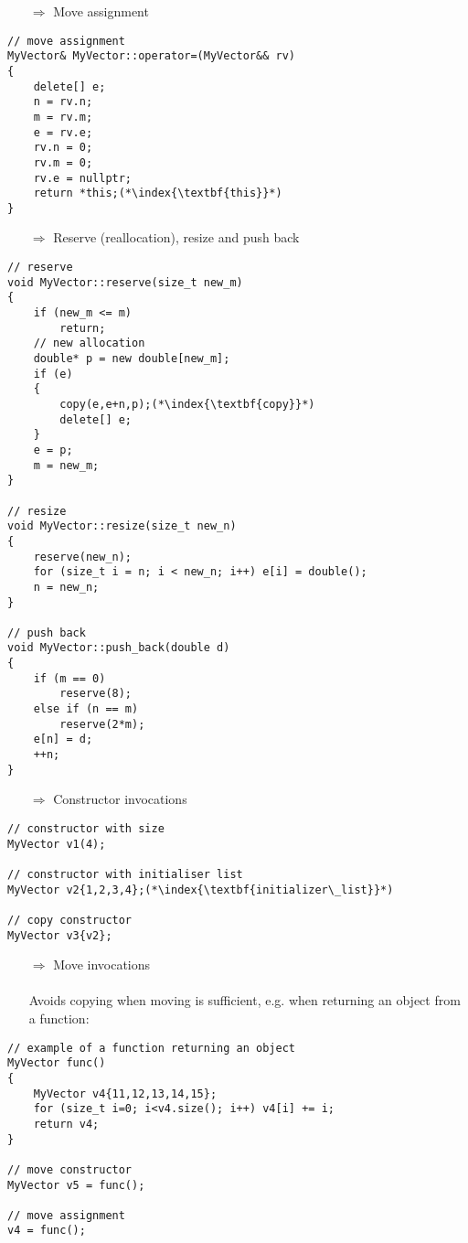 \documentclass[10pt]{article}
\begin{document}
\begin{enumerate}
\item[$\Rightarrow$] Move assignment
\end{enumerate}
\begin{lstlisting}
// move assignment
MyVector& MyVector::operator=(MyVector&& rv)
{
    delete[] e;
    n = rv.n;
    m = rv.m;
    e = rv.e;
    rv.n = 0;
    rv.m = 0;
    rv.e = nullptr;
    return *this;(*\index{\textbf{this}}*)
}
\end{lstlisting}
\begin{enumerate}
\item[$\Rightarrow$] Reserve (reallocation), resize and push back
\end{enumerate}
\begin{lstlisting}
// reserve
void MyVector::reserve(size_t new_m)
{
    if (new_m <= m)
        return;
    // new allocation
    double* p = new double[new_m];
    if (e)
    {
        copy(e,e+n,p);(*\index{\textbf{copy}}*)
        delete[] e;
    }
    e = p;
    m = new_m;
}

// resize
void MyVector::resize(size_t new_n)
{
    reserve(new_n);
    for (size_t i = n; i < new_n; i++) e[i] = double();
    n = new_n;
}

// push back
void MyVector::push_back(double d)
{
    if (m == 0)
        reserve(8);
    else if (n == m)
        reserve(2*m);
    e[n] = d;
    ++n;
}
\end{lstlisting}
\begin{enumerate}
\item[$\Rightarrow$] Constructor invocations
\end{enumerate}
\begin{lstlisting}
// constructor with size
MyVector v1(4); 

// constructor with initialiser list
MyVector v2{1,2,3,4};(*\index{\textbf{initializer\_list}}*)

// copy constructor
MyVector v3{v2}; 
\end{lstlisting}
\begin{enumerate}
\item[$\Rightarrow$] Move invocations\\ \\ Avoids copying when moving is sufficient, e.g. when returning an object from a function:
\end{enumerate}
\begin{lstlisting}
// example of a function returning an object
MyVector func()
{
    MyVector v4{11,12,13,14,15};
    for (size_t i=0; i<v4.size(); i++) v4[i] += i;
    return v4;
}

// move constructor
MyVector v5 = func(); 

// move assignment
v4 = func();       
\end{lstlisting}
%
%
\end{document}
